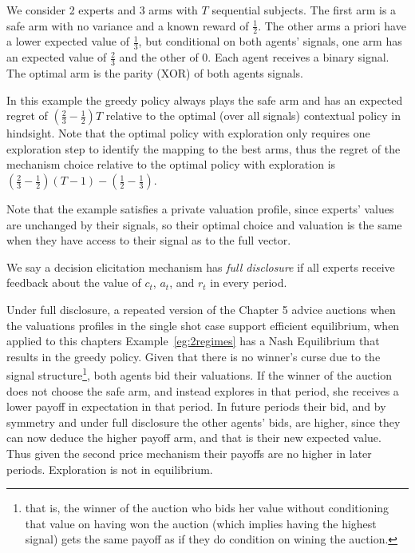 \begin{eg}\label{eg:2regimes}
   We consider 2 experts and 3 arms with $T$ sequential subjects. The first arm is a safe arm with no variance and a known reward of $\frac{1}{2}$. The other arms a priori have a lower expected value of $\frac{1}{3}$, but conditional on both agents' signals, one arm has an expected value of $\frac{2}{3}$ and the other of $0$. 
Each agent receives a binary signal. The optimal arm is the parity (XOR) of both agents signals. 
\end{eg}

In this example the greedy policy always plays the safe arm and has an expected regret of $\left(\frac{2}{3} - \frac{1}{2}\right)T$ relative to the optimal (over all signals) contextual policy in hindsight.
Note that the optimal policy with exploration only requires one exploration step to identify the mapping to the best arms, thus the regret of the mechanism choice  relative to the optimal policy with exploration is $\left(\frac{2}{3} - \frac{1}{2}\right)(T-1) - \left(\frac{1}{2} - \frac{1}{3}\right)$.

Note that the example satisfies a private valuation profile, since experts' values are unchanged by their signals, so their optimal choice and valuation is the same when they have access to their signal as to the full vector.

\begin{defn}
  We say a decision elicitation mechanism has \emph{full disclosure} if all experts receive feedback about the value of $c_t$, $a_t$, and $r_t$ in every period.
 \end{defn}


Under full disclosure, a repeated version of the Chapter 5 advice auctions when the valuations profiles in the single shot case support efficient equilibrium,  when applied to this chapters Example~\ref{eg:2regimes} has a Nash Equilibrium that results in the greedy policy. %
Given that there is no winner's curse due to the signal structure\footnote{that is, the winner of the auction who  bids her value without conditioning that value on having won the auction (which implies having the highest signal) gets the same payoff as if they do condition on wining the auction.}, both agents bid their valuations. %
If the winner of the auction does not choose the safe arm, and instead explores in that period, she receives a lower payoff in expectation in that period. In future periods their bid, and by symmetry and under full disclosure the other agents' bids, are higher, since they can now deduce the higher payoff arm, and that is their new expected value. Thus given the second price mechanism their payoffs are no higher in later periods. Exploration is not in equilibrium. 


